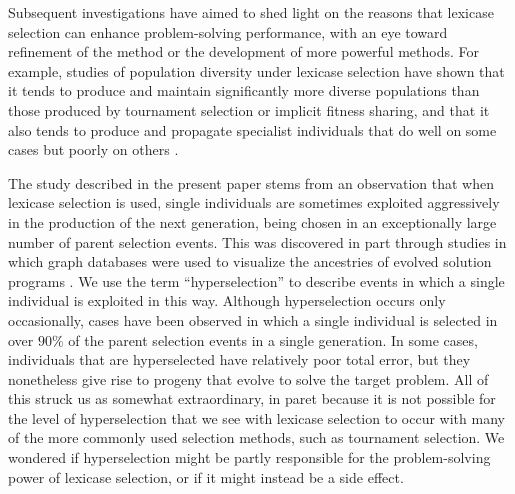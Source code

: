 \documentclass{sig-alternate}
\begin{document}
Subsequent investigations have aimed to shed light on the reasons that lexicase selection can enhance problem-solving performance, with an eye toward refinement of the method or the development of more powerful methods. For example, studies of population diversity under lexicase selection have shown that it tends to produce and maintain significantly more diverse populations than those produced by tournament selection or implicit fitness sharing, and that it also tends to produce and propagate specialist individuals that do well on some cases but poorly on others \cite{Helmuth:2015:GPTP,Helmuth:2015:dissertation}.

The study described in the present paper stems from an observation that when lexicase selection is used, single individuals are sometimes exploited aggressively in the production of the next generation, being chosen in an exceptionally large number of parent selection events. This was discovered in part through studies in which graph databases were used to visualize the ancestries of evolved solution programs \cite{McPhee:2015:GPTP}. We use the term ``hyperselection'' to describe events in which a single individual is exploited in this way. Although hyperselection occurs only occasionally, cases have been observed in which a single individual is selected in over $90\%$ of the parent selection events in a single generation. In some cases, individuals that are hyperselected have relatively poor total error, but they nonetheless give rise to progeny that evolve to solve the target problem. All of this struck us as somewhat extraordinary, in paret because it is not possible for the level of hyperselection that we see with lexicase selection to occur with many of the more commonly used selection methods, such as tournament selection. We wondered if hyperselection might be partly responsible for the problem-solving power of lexicase selection, or if it might instead be a side effect.
\end{document}
